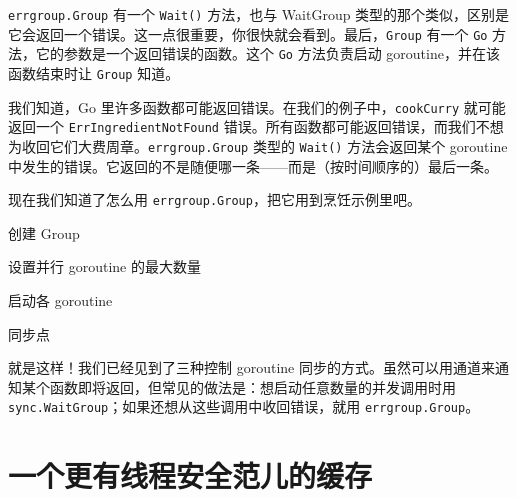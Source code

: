 \texttt{errgroup.Group} 有一个 \texttt{Wait()} 方法，也与 WaitGroup 类型的那个类似，区别是它会返回一个错误。这一点很重要，你很快就会看到。最后，\texttt{Group} 有一个 \texttt{Go} 方法，它的参数是一个返回错误的函数。这个 \texttt{Go} 方法负责启动 goroutine，并在该函数结束时让 \texttt{Group} 知道。

我们知道，Go 里许多函数都可能返回错误。在我们的例子中，\texttt{cookCurry} 就可能返回一个 \texttt{ErrIngredientNotFound} 错误。所有函数都可能返回错误，而我们不想为收回它们大费周章。\texttt{errgroup.Group} 类型的 \texttt{Wait()} 方法会返回某个 goroutine 中发生的错误。它返回的不是随便哪一条——而是（按时间顺序的）最后一条。

现在我们知道了怎么用 \texttt{errgroup.Group}，把它用到烹饪示例里吧。


\begin{codeannotations}
\item 创建 Group
\item 设置并行 goroutine 的最大数量
\item 启动各 goroutine
\item 同步点
\end{codeannotations}

就是这样！我们已经见到了三种控制 goroutine 同步的方式。虽然可以用通道来通知某个函数即将返回，但常见的做法是：想启动任意数量的并发调用时用 \texttt{sync.WaitGroup}；如果还想从这些调用中收回错误，就用 \texttt{errgroup.Group}。

\section{一个更有线程安全范儿的缓存}

